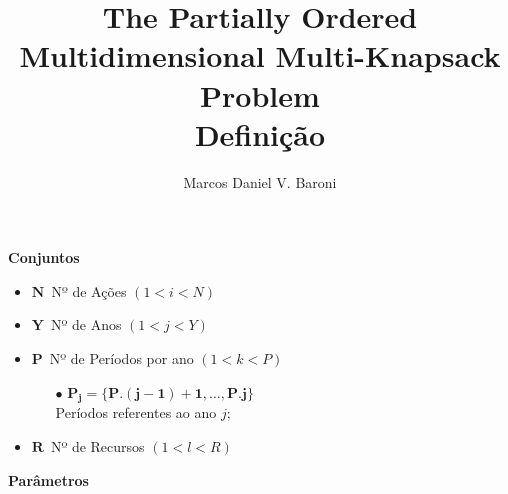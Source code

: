 \documentclass{article}
\title{The Partially Ordered Multidimensional Multi-Knapsack Problem \\ {Definição} }
\author{Marcos Daniel V. Baroni}
\newcommand{\topico}[1]{
  \vspace{20pt}
  {\Large \bf #1 }
}
\newcommand{\variavel}[1]{
  { \Large $ \bm{ #1 } \, $}
}
\begin{document}
\maketitle

\topico{Conjuntos}

\begin{itemize}
  \item \variavel{N} Nº de Ações {\scriptsize $(1 < i < N) $}
  \item \variavel{Y} Nº de Anos  {\scriptsize $(1 < j < Y) $}
  \item \variavel{P} Nº de Períodos por ano {\scriptsize $(1 < k < P)$}
    \begin{itemize}
	  \item[$\bullet$]{\small $\bm{P_{j} = \{P.(j-1)+1, \ldots, P.j\}}$ \\ Períodos referentes ao ano $j$;} 
	\end{itemize}
  \item \variavel{R} Nº de Recursos {\scriptsize $(1 < l < R)$}
\end{itemize}

\topico{Parâmetros}
\end{document}
